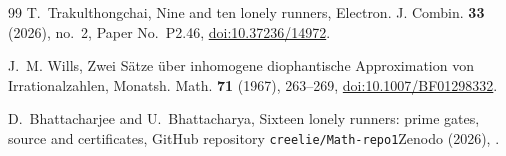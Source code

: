 \begin{thebibliography}{99}
T.~Trakulthongchai, Nine and ten lonely runners, Electron. J. Combin.
\textbf{33} (2026), no.~2, Paper No.~P2.46,
\href{https://doi.org/10.37236/14972}{doi:10.37236/14972}.

J.~M. Wills, Zwei S\"atze \"uber inhomogene diophantische Approximation von
Irrationalzahlen, Monatsh. Math. \textbf{71} (1967), 263--269,
\href{https://doi.org/10.1007/BF01298332}{doi:10.1007/BF01298332}.

D.~Bhattacharjee and U.~Bhattacharya, Sixteen lonely runners: prime gates,
source and certificates, \ifx\zenodoID\empty GitHub repository
\texttt{creelie/Math-repo1}\else Zenodo\fi{} (2026), \archivelink.

\end{thebibliography}


